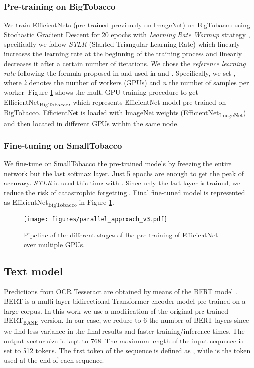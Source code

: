 \documentclass[runningheads]{llncs}
\begin{document}
\subsubsection{Pre-training on BigTobacco}

We train EfficientNets (pre-trained previously on ImageNet) on BigTobacco using Stochastic Gradient Descent for 20 epochs with \textit{Learning Rate Warmup} strategy \cite{bag_tricks}, specifically we follow \textit{STLR} (Slanted Triangular Learning Rate) \cite{ulmfit} which linearly increases the learning rate at the beginning of the training process and linearly decreases it after a certain number of iterations. We chose the \textit{reference learning rate}  following the formula proposed in \cite{1_hour} and used in \cite{15_min} and \cite{bag_tricks}. Specifically, we set , where \textit{k} denotes the number of workers (GPUs) and \textit{n} the number of samples per worker. Figure \ref{fig:parallel_approach} shows the multi-GPU training procedure to get EfficientNet\textsubscript{BigTobacco}, which represents EfficientNet model pre-trained on BigTobacco. EfficientNet is loaded with ImageNet weights (EfficientNet\textsubscript{ImageNet}) and then located in different GPUs within the same node.

\subsubsection{Fine-tuning on SmallTobacco}\label{fine-tune}

We fine-tune on SmallTobacco the pre-trained models by freezing the entire network but the last softmax layer. Just 5 epochs are enough to get the peak of accuracy. \textit{STLR} is used this time with . Since only the last layer is trained, we reduce the risk of catastrophic forgetting \cite{catastrofic}. Final fine-tuned model is represented as EfficientNet\textsubscript{BigTobacco} in Figure \ref{fig:parallel_approach}.

\begin{figure}[H]
	\begin{centering}
	\texttt{[image: figures/parallel\_approach\_v3.pdf]}
	\caption{Pipeline of the different stages of the pre-training of EfficientNet over multiple GPUs.}
	\label{fig:parallel_approach}
	\end{centering}
\end{figure}

\subsection{Text model}
Predictions from OCR Tesseract \cite{tesseract} are obtained by means of the BERT model \cite{BERT}. BERT is a multi-layer bidirectional Transformer encoder model pre-trained on a large corpus. In this work we use a modification of the original pre-trained BERT\textsubscript{BASE} version. In our case, we reduce to 6 the number of BERT layers since we find less variance in the final results and faster training/inference times. The output vector size is kept to 768. The maximum length of the input sequence is set to 512 tokens. The first token of the sequence is defined as , while  is the token used at the end of each sequence.
\end{document}
